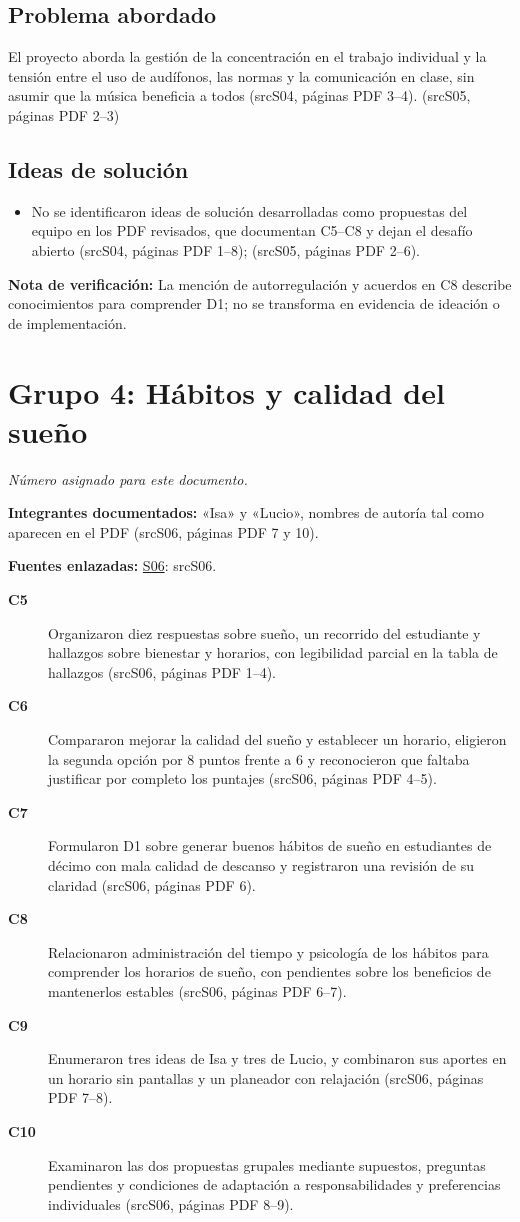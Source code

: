 \documentclass[11pt,a4paper]{article}
\newcommand{\evid}[2]{(\csname src#1\endcsname, páginas PDF #2)}
\begin{document}
\subsection*{Problema abordado}
El proyecto aborda la gestión de la concentración en el trabajo individual y la tensión entre el uso de audífonos, las normas y la comunicación en clase, sin asumir que la música beneficia a todos \evid{S04}{3--4}. \evid{S05}{2--3}
\subsection*{Ideas de solución}
\begin{itemize}
\item No se identificaron ideas de solución desarrolladas como propuestas del equipo en los PDF revisados, que documentan C5--C8 y dejan el desafío abierto \evid{S04}{1--8}; \evid{S05}{2--6}.
\end{itemize}
{\small\textbf{Nota de verificación:} La mención de autorregulación y acuerdos en C8 describe conocimientos para comprender D1; no se transforma en evidencia de ideación o de implementación.}
\clearpage
\section*{Grupo 4: Hábitos y calidad del sueño}
\textit{Número asignado para este documento.}

\textbf{Integrantes documentados:} «Isa» y «Lucio», nombres de autoría tal como aparecen en el PDF \evid{S06}{7 y 10}.

\textbf{Fuentes enlazadas:} \hyperlink{fuente-S06}{S06}: \csname srcS06\endcsname.

\begin{description}
\item[\textbf{C5}] Organizaron diez respuestas sobre sueño, un recorrido del estudiante y hallazgos sobre bienestar y horarios, con legibilidad parcial en la tabla de hallazgos \evid{S06}{1--4}.
\item[\textbf{C6}] Compararon mejorar la calidad del sueño y establecer un horario, eligieron la segunda opción por 8 puntos frente a 6 y reconocieron que faltaba justificar por completo los puntajes \evid{S06}{4--5}.
\item[\textbf{C7}] Formularon D1 sobre generar buenos hábitos de sueño en estudiantes de décimo con mala calidad de descanso y registraron una revisión de su claridad \evid{S06}{6}.
\item[\textbf{C8}] Relacionaron administración del tiempo y psicología de los hábitos para comprender los horarios de sueño, con pendientes sobre los beneficios de mantenerlos estables \evid{S06}{6--7}.
\item[\textbf{C9}] Enumeraron tres ideas de Isa y tres de Lucio, y combinaron sus aportes en un horario sin pantallas y un planeador con relajación \evid{S06}{7--8}.
\item[\textbf{C10}] Examinaron las dos propuestas grupales mediante supuestos, preguntas pendientes y condiciones de adaptación a responsabilidades y preferencias individuales \evid{S06}{8--9}.
\end{description}
\end{document}
